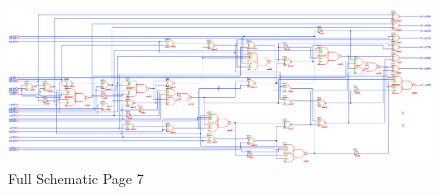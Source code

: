 \documentclass[11pt]{article}
\begin{document}
		
		\begin{figure}[H] 
			\centering 
			\includegraphics[width=\textwidth,height=\dimexpr\textheight-4\baselineskip-\abovecaptionskip-\belowcaptionskip\relax,keepaspectratio]{"Pictures/Full Schematic Page 7"}
			\caption{Full Schematic Page 7} 
			\label{fig:Full-Schematic-Page-7} 
		\end{figure}
		
\end{document}
